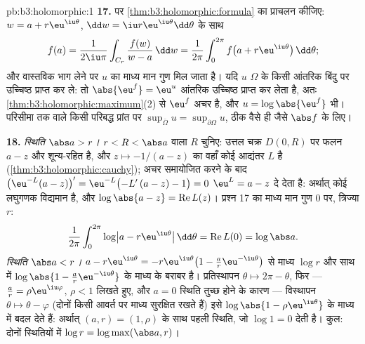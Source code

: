 \begin{solution}{pb:b3:holomorphic:1}
\textbf{17.}  पर \cref{thm:b3:holomorphic:formula} का प्राचलन कीजिए: $w = a + r\eu^{\iu\theta}$, $\dd w = \iu
r\eu^{\iu\theta}\dd\theta$ के साथ
\[
f(a) = \frac1{2\iu\pi}\int_{C_r}\frac{f(w)}{w - a}\,\dd w
= \frac1{2\pi}\int_0^{2\pi}
f\bigl(a + r\eu^{\iu\theta}\bigr)\,\dd\theta ;
\]
और वास्तविक भाग लेने पर $u$ का माध्य मान गुण मिल जाता है। यदि
$u$  $\Omega$ के किसी आंतरिक बिंदु पर उच्चिष्ठ प्राप्त कर ले:
तो $\abs{\eu^f} = \eu^u$ आंतरिक उच्चिष्ठ प्राप्त कर लेता है, अतः \cref{thm:b3:holomorphic:maximum}(2) से $\eu^f$
अचर है, और $u =
\log\abs{\eu^f}$ भी। परिसीमा तक  वाले किसी परिबद्ध प्रांत पर
$\sup_{\bar\Omega}u =
\sup_{\partial\Omega}u$, ठीक वैसे ही जैसे $\abs f$ के लिए।

\textbf{18.} \emph{स्थिति $\abs a > r$।} $r < R
< \abs a$ वाला $R$ चुनिए: उत्तल चक्र
$D(0, R)$ पर फलन $a - z$  और शून्य-रहित है, और $z \mapsto -1/(a - z)$ का वहाँ
कोई आद्यंतर $L$ है (\cref{thm:b3:holomorphic:cauchy}); अचर समायोजित करने के बाद $\bigl(\eu^{-L}(a -
z)\bigr)' = \eu^{-L}\bigl(-L'\,(a - z) - 1\bigr) = 0$ $\eu^L = a - z$
दे देता है: अर्थात् कोई  लघुगणक विद्यमान है, और $\log\abs{a - z} = \operatorname{Re}L(z)$।
प्रश्न 17 का माध्य मान गुण $0$ पर, त्रिज्या $r$:
\[
\frac1{2\pi}\int_0^{2\pi}
\log\bigl|a - r\eu^{\iu\theta}\bigr|\,\dd\theta
= \operatorname{Re}L(0) = \log\abs a .
\]
\emph{स्थिति $\abs a < r$।} $a - r\eu^{\iu\theta} =
-r\eu^{\iu\theta}\bigl(1 - \frac ar\eu^{-\iu\theta}\bigr)$ से माध्य $\log r$ और साथ में $\log\abs{1 -
\frac ar\eu^{-\iu\theta}}$ के माध्य
के बराबर है। प्रतिस्थापन $\theta \mapsto
2\pi - \theta$, फिर --- $\frac ar =
\rho\eu^{\iu\varphi}$, $\rho < 1$ लिखते हुए, और
$a = 0$ स्थिति तुच्छ होने के कारण --- विस्थापन $\theta \mapsto \theta - \varphi$ (दोनों किसी आवर्त
पर माध्य सुरक्षित रखते हैं) इसे $\log\abs{1 - \rho\eu^{\iu\theta}}$ के माध्य में बदल देते हैं:
अर्थात् $(a, r) = (1, \rho)$ के साथ पहली स्थिति, जो $\log 1 = 0$ देती है। कुल: दोनों
स्थितियों में $\log r = \log\max(\abs a, r)$।


\end{solution}

